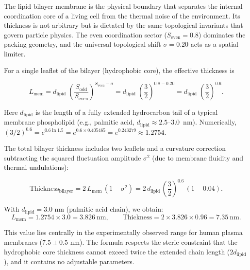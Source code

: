 \documentclass[12pt,a4paper]{article}
\theoremstyle{remark}
\begin{document}
	The lipid bilayer membrane is the physical boundary that separates the internal
	coordination core of a living cell from the thermal noise of the environment.
	Its thickness is not arbitrary but is dictated by the same topological invariants
	that govern particle physics.  The even coordination sector
	(\(S_{\mathrm{even}} = 0.8\)) dominates the packing geometry, and the universal
	topological shift \(\sigma = 0.20\) acts as a spatial limiter.
	
	For a single leaflet of the bilayer (hydrophobic core), the effective thickness is
	
	\begin{equation}
		L_{\mathrm{mem}} = d_{\mathrm{lipid}} \;
		\left( \frac{S_{\mathrm{odd}}}{S_{\mathrm{even}}} \right)^{S_{\mathrm{even}} - \sigma}
		= d_{\mathrm{lipid}} \;
		\left( \frac{3}{2} \right)^{0.8 - 0.20}
		= d_{\mathrm{lipid}} \;
		\left( \frac{3}{2} \right)^{0.6}.
	\end{equation}
	
	Here \(d_{\mathrm{lipid}}\) is the length of a fully extended hydrocarbon tail
	of a typical membrane phospholipid (e.g., palmitic acid, \(d_{\mathrm{lipid}}
	\approx 2.5\)--\(3.0\)~nm).  Numerically, \((3/2)^{0.6} = e^{0.6\ln 1.5}
	= e^{0.6 \times 0.405465} = e^{0.243279} \approx 1.2754\).
	
	The total bilayer thickness includes two leaflets and a curvature correction
	subtracting the squared fluctuation amplitude \(\sigma^2\) (due to membrane
	fluidity and thermal undulations):
	
	\begin{equation}
		\boxed{\text{Thickness}_{\text{bilayer}} = 2 \, L_{\mathrm{mem}} \,
			(1 - \sigma^2) = 2 \, d_{\mathrm{lipid}} \,
			\left( \frac{3}{2} \right)^{0.6} \, (1 - 0.04)}.
	\end{equation}
	
	With \(d_{\mathrm{lipid}} = 3.0\) nm (palmitic acid chain), we obtain:
	\[
	L_{\mathrm{mem}} = 1.2754 \times 3.0 = 3.826\ \text{nm},
	\qquad
	\text{Thickness} = 2 \times 3.826 \times 0.96 = 7.35\ \text{nm}.
	\]
	
	This value lies centrally in the experimentally observed range for human
	plasma membranes (\(7.5 \pm 0.5\) nm).  The formula respects the steric
	constraint that the hydrophobic core thickness cannot exceed twice the
	extended chain length (\(2 d_{\mathrm{lipid}}\)), and it contains no adjustable
	parameters.
	
\end{document}
